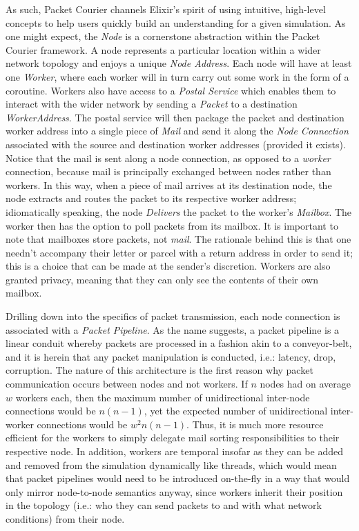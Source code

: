 As such, Packet Courier channels Elixir's spirit of using intuitive, high-level concepts to help users quickly build
an understanding for a given simulation. As one might expect, the \emph{Node} is a cornerstone abstraction within the
Packet Courier framework. A node represents a particular location within a wider network topology and enjoys a unique
\emph{Node Address}. Each node will have at least one \emph{Worker}, where each worker will in turn carry out some
work in the form of a coroutine. Workers also have access to a \emph{Postal Service} which enables them to interact
with the wider network by sending a \emph{Packet} to a destination \emph{WorkerAddress}. The postal service will then
package the packet and destination worker address into a single piece of \emph{Mail} and send it along the
\emph{Node Connection} associated with the source and destination worker addresses (provided it exists). Notice that
the mail is sent along a node connection, as opposed to a \emph{worker} connection, because mail is principally
exchanged between nodes rather than workers. In this way, when a piece of mail arrives at its destination node, the
node extracts and routes the packet to its respective worker address; idiomatically speaking, the node
\emph{Delivers} the packet to the worker's \emph{Mailbox}. The worker then has the option to poll packets from its
mailbox. It is important to note that mailboxes store packets, not \emph{mail}. The rationale behind this is that one
needn't accompany their letter or parcel with a return address in order to send it; this is a choice that can be made
at the sender's discretion. Workers are also granted privacy, meaning that they can only see the contents of their own
mailbox.

Drilling down into the specifics of packet transmission, each node connection is associated with a \emph{Packet
Pipeline}. As the name suggests, a packet pipeline is a linear conduit whereby packets are processed in a fashion
akin to a conveyor-belt, and it is herein that any packet manipulation is conducted, i.e.: latency, drop, corruption.
The nature of this architecture is the first reason why packet communication occurs between nodes and not workers. If
$n$ nodes had on average $w$ workers each, then the maximum number of unidirectional inter-node connections would be
$n(n-1)$, yet the expected number of unidirectional inter-worker connections would be $w^2n(n-1)$. Thus, it is much
more resource efficient for the workers to simply delegate mail sorting responsibilities to their respective node. In
addition, workers are temporal insofar as they can be added and removed from the simulation dynamically like threads,
which would mean that packet pipelines would need to be introduced on-the-fly in a way that would only mirror
node-to-node semantics anyway, since workers inherit their position in the topology (i.e.: who they can send packets
to and with what network conditions) from their node.

